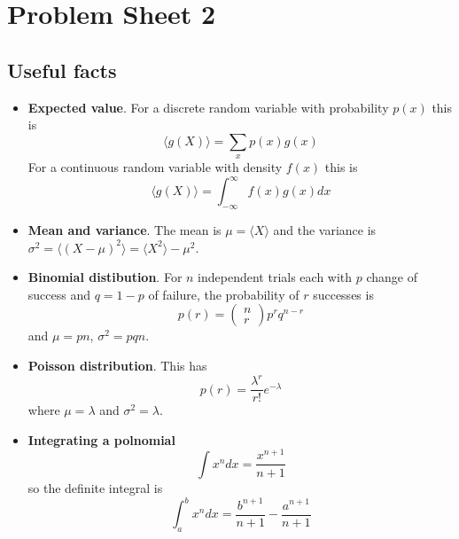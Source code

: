 \documentclass[11pt,a4paper]{scrartcl}
\begin{document}
\section*{Problem Sheet 2}

\subsection*{Useful facts}

\begin{itemize}

\item \textbf{Expected value}. For a discrete random variable with probability $p(x)$ this is
\begin{equation}
\langle g(X) \rangle = \sum_x p(x)g(x)
\end{equation}
For a continuous random variable with density $f(x)$ this is
\begin{equation}
\langle g(X)\rangle = \int_{-\infty}^\infty{f(x)g(x)}dx
\end{equation}


\item \textbf{Mean and variance}. The mean is $\mu=\langle X\rangle$ and the variance is $\sigma^2=\langle(X-\mu)^2\rangle=\langle X^2\rangle - \mu^2$.

\item \textbf{Binomial distibution}. For $n$ independent trials each with $p$ change of success and $q=1-p$ of failure, the probability of $r$ successes is 
\begin{equation}
p(r)=\left(\begin{array}{c}n\\r\end{array}\right)p^rq^{n-r}
\end{equation}
and $\mu=pn$, $\sigma^2=pqn$.

\item \textbf{Poisson distribution}. This has
\begin{equation}
p(r)=\frac{\lambda^r}{r!}e^{-\lambda}
\end{equation}
where $\mu=\lambda$ and $\sigma^2=\lambda$.

\item \textbf{Integrating a polnomial}
\begin{equation}
\int x^n dx=\frac{x^{n+1}}{n+1}
\end{equation}
so the definite integral is
\begin{equation}
\int_{a}^b x^n dx=\frac{b^{n+1}}{n+1}-\frac{a^{n+1}}{n+1}
\end{equation}

\end{itemize}
\end{document}
